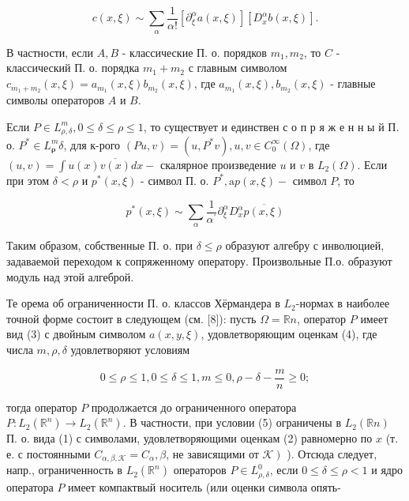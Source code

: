 \documentclass[10pt]{article}
\begin{document}
\[

c(x, \xi) \sim \sum_{\alpha} \frac{1}{\alpha !}\left[\partial_{\xi}^{\alpha} a(x, \xi)\right]\left[D_{x}^{\alpha} b(x, \xi)\right] .

\]



В частности, если $A, B$ - классические П. о. порядков $m_{1}, m_{2}$, то $C$ - классический П. о. порядка $m_{1}+m_{2}$ с главным символом $c_{m_{1}+m_{2}}(x, \xi)=a_{m_{1}}(x, \xi) b_{m_{2}}(x, \xi)$, где $a_{m_{1}}(x, \xi), b_{m_{2}}(x, \xi)$ - главные символы операторов $A$ и $B$.



Если $P \in L_{\rho, \delta}^{m}, 0 \leqslant \delta \leqslant \rho \leqslant 1$, то существует и единствен с о п р я ж е н н ы й П. о. $P^{*} \in L_{\boldsymbol{\rho}}^{m} \delta$, для к-рого $(P u, v)=\left(u, P^{*} v\right), u, v \in C_{0}^{\infty}(\Omega)$, где $(u, v)=\int u(x) \overline{v(x)} d x-$ скалярное произведение $u$ и $v$ в $L_{2}(\Omega)$. Если при этом $\delta<\rho$ и $p^{*}(x, \xi)$ - символ П. о. $P^{*}, \mathrm{a} p(x, \xi)-$ символ $P$, то



\[

p^{*}(x, \xi) \sim \sum_{\alpha} \frac{1}{\alpha^{\prime}} \partial_{\xi}^{\alpha} D_{x}^{\alpha} \overline{p(x, \xi)}

\]



Таким образом, собственные П. о. при $\delta \leqslant \rho$ образуют алгебру с инволюцией, задаваемой переходом к сопряженному оператору. Произвольные П.о. образуют модуль над этой алгеброй.



Те орема об ограниченности П. о. классов Хёрмандера в $L_{2}$-нормах в наиболее точной форме состоит в следующем (см. [8]): пусть $\Omega=\mathbb{R} n$, оператор $P$ имеет вид (3) с двойным символом $a(x, y, \xi)$, удовлетворяющим оценкам (4), где числа $m, \rho, \delta$ удовлетворяют условиям



\[

0 \leqslant \rho \leqslant 1,0 \leqslant \delta \leqslant 1, m \leqslant 0, \rho-\delta-\frac{m}{n} \geqslant 0 ;

\]



тогда оператор $P$ продолжается до ограниченного оператора $P: L_{2}\left(\mathbb{R}^{n}\right) \rightarrow L_{2}\left(\mathbb{R}^{n}\right)$. В частности, при условии (5) ограничены в $L_{2}(\mathbb{R} n)$ П. о. вида (1) с символами, удовлетворяющими оценкам (2) равномерно по $x$ (т. е. с постоянными $C_{\alpha, \beta, \mathscr{K}}=C_{\alpha}, \beta$, не зависящими от $\left.\mathscr{K}\right)$ ). Отсюда следует, напр., ограниченность в $L_{2}\left(\mathbb{R}^{n}\right)$ операторов $P \in L_{\rho, \delta}^{0}$, если $0 \leqslant \delta \leqslant \rho<1$ и ядро оператора $P$ имеет компактвый носитель (или оценки символа опять-
\end{document}
